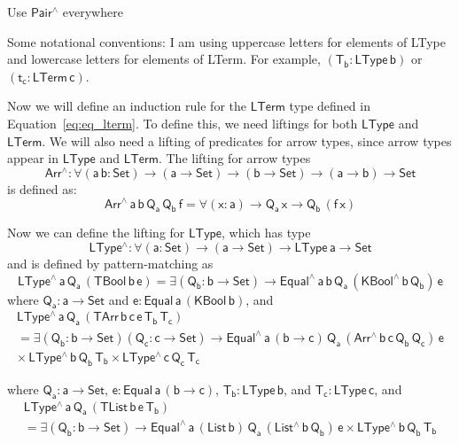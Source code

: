 \documentclass[acmsmall,screen,review,anonymous]{acmart}
\theoremstyle{definition}
\begin{document}

{\color{red} Use $\mathsf{Pair^{\wedge}}$ everywhere}

{\color{blue} Some notational conventions: I am using uppercase letters for elements of LType and 
lowercase letters for elements of LTerm. For example, $\mathsf{(T_b : LType \, b)}$ or $\mathsf{(t_c : LTerm \,c)}$.}

Now we will define an induction rule for the $\mathsf{LTerm}$ type defined in 
Equation~\ref{eq:eq_lterm}. To define this, we need liftings for both $\mathsf{LType}$ and
$\mathsf{LTerm}$. We will also need a lifting of predicates for arrow types, since arrow types appear in 
$\mathsf{LType}$ and $\mathsf{LTerm}$. The lifting for arrow types 
\[
  \mathsf{Arr^{\wedge} : \forall (a\, b : Set) \to (a \to Set) \to (b \to Set) \to (a \to b) \to Set}
\]
is defined as: 
\[
  \mathsf{Arr^{\wedge}\, a\, b\, Q_a\, Q_b\, f = \forall (x : a) \to Q_a\, x \to Q_b\, (f\, x)}
\]

\noindent
Now we can define the lifting for $\mathsf{LType}$, which has type 
\[
\mathsf{LType^{\wedge} : \forall (a : Set) \to (a \to Set) \to LType\,a \to Set}
\]
and is defined by pattern-matching as
\[
  \mathsf{LType^{\wedge}\,a\,Q_a\,(TBool\,b\,e) = \exists (Q_b : b \to Set) 
  \to Equal^{\wedge}\, a\, b\, Q_a\, (KBool^{\wedge} \,b \,Q_b) \,e}
\]
where $\mathsf{Q_a : a \to Set}$ and $\mathsf{e : Equal \,a \,(KBool\,b)}$,
and
\begin{multline*}
  \mathsf{LType^{\wedge}\,a\,Q_a\,(TArr\, b\, c\, e\, T_b\, T_c)} \\
\mathsf{=
\exists (Q_b : b \to Set) (Q_c : c \to Set)
  \to Equal^{\wedge}\,a\, (b \to c)\, Q_a\, (Arr^{\wedge} \, b\, c\, Q_b \, Q_c) \, e} \\ 
\mathsf{
  \times \, LType^{\wedge}\,b\,Q_b\,T_b \times LType^{\wedge}\,c\,Q_c\,T_c
}
\end{multline*}

where $\mathsf{Q_a : a \to Set}$, $\mathsf{e : Equal\, a\, (b \to c)}$, $\mathsf{T_b : LType \,b}$, and 
$\mathsf{T_c : LType \,c}$,
and 
\begin{multline*}
  \mathsf{LType^{\wedge}\,a\,Q_a\,(TList\, b\, e\, T_b)} \\
\mathsf{=
\exists (Q_b : b \to Set) 
  \to Equal^{\wedge}\,a\, (List\, b)\, Q_a\, (List^{\wedge} \, b\, Q_b) \, e 
  \times LType^{\wedge}\,b\,Q_b\,T_b 
}
\end{multline*}
\end{document}
